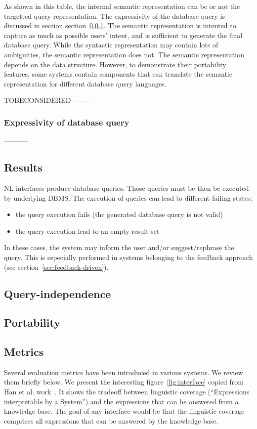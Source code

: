 \documentclass[10pt,journal,letterpaper,compsoc]{IEEEtran}
\begin{document}
As shown in this table, the internal semantic representation can be or not the
targetted query representation. 
The expressivity of the database query is discussed in section
section~\ref{sec:big-picture-expressivity}. 
The semantic representation is intented to capture as much as possible users'
intent, and is sufficient to generate the final database query. 
While the syntactic representation may contain lots of ambiguities, the semantic
representation does not. 
The semantic representation depends on the data structure. However, to
demonstrate their portability features, some systems contain components that
can translate the semantic representation for different database query
languages.


TOBECONSIDERED
-------
\subsubsection{Expressivity of database query}
\label{sec:big-picture-expressivity}
-----------



\subsection{Results}
\label{sec:big-picture-results}
NL interfaces produce database queries.
Those queries must be then be executed by underlying DBMS.
The execution of queries can lead to different failing states:
\begin{itemize}
  \item the query execution fails (the generated database query is not valid)
  \item the query execution lead to an empty result set
\end{itemize}
In these cases, the system may inform the user and/or suggest/rephrase the
query. This is especially performed in systems belonging to the feedback
approach (see section~\ref{sec:feedback-driven}). 


\subsection{Query-independence}
\subsection{Portability}


\subsection{Metrics}
\label{sec:big-picture-metrics}
Several evaluation metrics have been introduced in various systems. We review
them briefly below.
We present the interesting figure~\ref{fig:interface} copied from Han et al.
work~\cite{Han:2010:NLI:1719970.1720022}. It shows the tradeoff between
linguistic coverage (``Expressions interpretable by a System'') and the
expressions that can be answered from a knowledge base. The goal of any
interface would be that the linguistic coverage comprises all expressions that
can be answered by the knowledge base.
\end{document}
